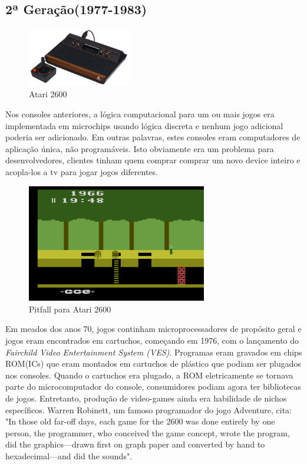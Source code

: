 \documentclass[paper=a4, fontsize=11pt]{scrartcl}	%
\numberwithin{equation}{section}															%
\numberwithin{figure}{section}																%
\numberwithin{table}{section}																%
\begin{document}
\subsection{2ª Geração(1977-1983)}
\begin{figure}[h!]
	\centering
    \includegraphics[width=0.4\textwidth]{img/atari}
    \caption{Atari 2600}
\end{figure}
Nos consoles anteriores, a lógica computacional para um ou mais jogos era implementada em microchips usando lógica discreta e nenhum jogo adicional poderia ser adicionado. Em outras palavras, estes consoles eram computadores de aplicação única, não programáveis. Isto obviamente era um problema para desenvolvedores, clientes tinham quem comprar comprar um novo device inteiro e acopla-los a tv para jogar jogos diferentes.\\
\begin{figure}[h!]
	\centering
    \includegraphics[width=0.7\textwidth]{img/pitfall}
    \caption{Pitfall para Atari 2600}
\end{figure}
Em meados dos anos 70, jogos continham microprocessadores de propósito geral e jogos eram encontrados em cartuchos, começando em 1976, com o lançamento do \textit{Fairchild Video Entertainment System (VES)}. Programas eram gravados em chips ROM(ICs) que eram montados em cartuchos de plástico que podiam ser plugados nos consoles. Quando o cartuchos era plugado, a ROM eletricamente se tornava parte do microcomputador do console, consumidores podiam agora ter bibliotecas de jogos. Entretanto, produção de video-games ainda era habilidade de nichos específicos. Warren Robinett, um famoso programador do jogo Adventure, cita: "In those old far-off days, each game for the 2600 was done entirely by one person, the programmer, who conceived the game concept, wrote the program, did the graphics—drawn first on graph paper and converted by hand to hexadecimal—and did the sounds".\\
\end{document}
